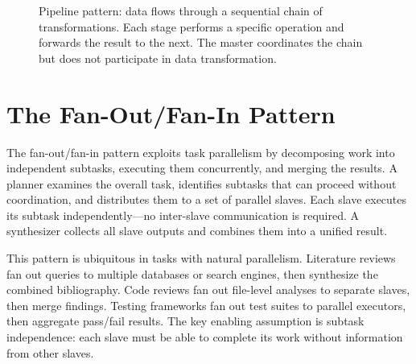 \begin{figure}[t]
\centering
{}
\caption{Pipeline pattern: data flows through a sequential chain of transformations. Each stage performs a specific operation and forwards the result to the next. The master coordinates the chain but does not participate in data transformation.}
\label{fig:pipeline_pattern}
\end{figure}

\section{The Fan-Out/Fan-In Pattern}\label{sec:fanout}

The fan-out/fan-in pattern exploits task parallelism by decomposing work into independent subtasks, executing them concurrently, and merging the results.
A planner examines the overall task, identifies subtasks that can proceed without coordination, and distributes them to a set of parallel slaves.
Each slave executes its subtask independently---no inter-slave communication is required.
A synthesizer collects all slave outputs and combines them into a unified result.

This pattern is ubiquitous in tasks with natural parallelism.
Literature reviews fan out queries to multiple databases or search engines, then synthesize the combined bibliography.
Code reviews fan out file-level analyses to separate slaves, then merge findings.
Testing frameworks fan out test suites to parallel executors, then aggregate pass/fail results.
The key enabling assumption is subtask independence: each slave must be able to complete its work without information from other slaves.

